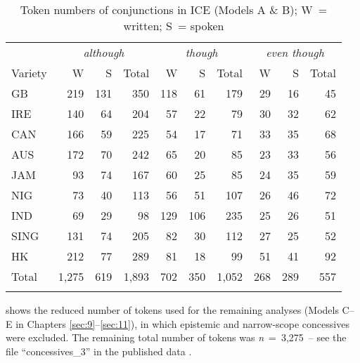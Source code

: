 \begin{table}
\caption{\label{tab:A3}Token numbers of conjunctions in ICE (Models A \& B); W~= written; S~= spoken}
\begin{tabular}{l *3{rrr}}
\lsptoprule
& \multicolumn{3}{c}{{\itshape although}} & \multicolumn{3}{c}{{\itshape though}} & \multicolumn{3}{c}{{\itshape even though}}\\\cmidrule(lr){2-4}\cmidrule(lr){5-7}\cmidrule(lr){8-10}
Variety & W & S & Total  & W & S & Total  & W & S & Total\\\midrule
GB & 219 & 131 & 350  &  118 & 61 & 179  &  29 & 16 & 45\\
IRE & 140 & 64 & 204  &  57 & 22 & 79  &  30 & 32 & 62\\
CAN & 166 & 59 & 225  &  54 & 17 & 71  &  33 & 35 & 68\\
AUS & 172 & 70 & 242  &  65 & 20 & 85  &  23 & 33 & 56\\
JAM & 93 & 74 & 167  &  60 & 25 & 85  &  24 & 35 & 59\\
NIG & 73 & 40 & 113  &  56 & 51 & 107  &  26 & 46 & 72\\
IND & 69 & 29 & 98  &  129 & 106 & 235  &  25 & 26 & 51\\
SING & 131 & 74 & 205  &  82 & 30 & 112  &  27 & 25 & 52\\
HK & 212 & 77 & 289  &  81 & 18 & 99  &  51 & 41 & 92\\\midrule
Total & 1,275 & 619 & 1,893  &  702 & 350 & 1,052  &  268 & 289 & 557\\
\lspbottomrule
\end{tabular}
\end{table}


 shows the reduced number of tokens used for the remaining analyses (Models C–E in Chapters \ref{sec:9}–\ref{sec:11}), in which epistemic and narrow-scope concessives were excluded. The remaining total number of tokens was \textit{n}~=~3,275~– see the file “concessives\_3” in the published data \citep{Schützler2021}.

